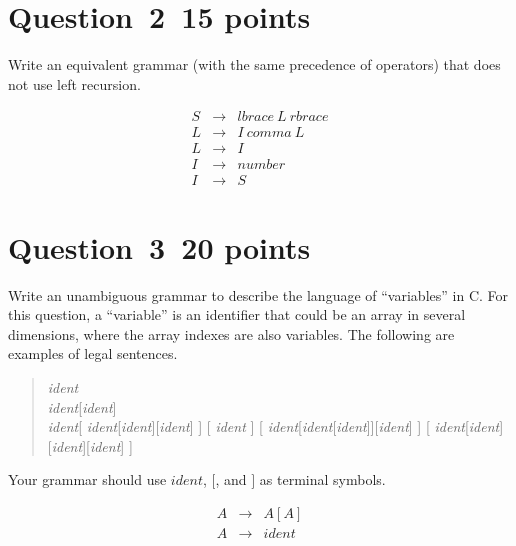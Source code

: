 \documentclass[10pt]{article}
\begin{document}
\section*{Question~2~\hfill 15 points}

Write an equivalent grammar (with the same precedence
of operators) that does not use left recursion.
\begin{framed}
\begin{eqnarray*}
    S & \rightarrow & \mathit{lbrace} ~L~ \mathit{rbrace}
    \\
    L & \rightarrow & I ~\mathit{comma}~ L
    \\
    L & \rightarrow & I
    \\
    I & \rightarrow & \mathit{number}
    \\
    I & \rightarrow & S
\end{eqnarray*}
\end{framed}
\section*{Question~3~\hfill 20 points}

Write an unambiguous grammar to describe the language of 
``variables'' in C.
For this question, a ``variable'' is an identifier
that could be an array in several dimensions,
where the array indexes are also variables.
The following are examples of legal sentences.
\begin{quote}
  \emph{ident} \\
  \emph{ident}[\emph{ident}] \\
  \emph{ident}[ \emph{ident}[\emph{ident}][\emph{ident}] ]
  [ \emph{ident} ]
  [ \emph{ident}[\emph{ident}[\emph{ident}]][\emph{ident}] ]
  [ \emph{ident}[\emph{ident}][\emph{ident}][\emph{ident}] ]
\end{quote}
Your grammar should use $\mathit{ident}$, $[$, and $]$ as
terminal symbols.
\begin{framed}
\begin{eqnarray*}
    A & \rightarrow & A[A] \\
    A & \rightarrow & ident
\end{eqnarray*}
\end{framed}
\end{document}
